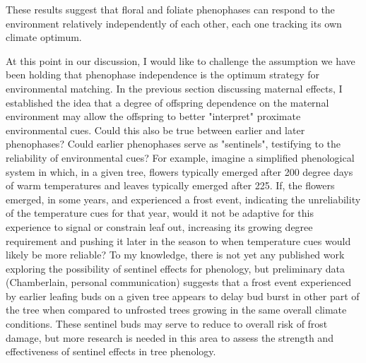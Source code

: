 \documentclass{article}\usepackage[]{graphicx}\usepackage[]{color}
\begin{document}
These results suggest that floral and foliate phenophases can respond to the environment relatively independently of each other, each one tracking its own climate optimum. 
\par At this point in our discussion, I would like to challenge the assumption we have been holding that phenophase independence is the optimum strategy for environmental matching. In the previous section discussing maternal effects, I established the idea that a degree of offspring dependence on the maternal environment may allow the offspring to better "interpret" proximate environmental cues. Could this also be true between earlier and later phenophases? Could earlier phenophases serve as "sentinels", testifying to the reliability of environmental cues? For example, imagine a simplified phenological system in which, in a given tree, flowers typically emerged after 200 degree days of warm temperatures and leaves typically emerged after 225. If, the flowers emerged, in some years, and experienced a frost event, indicating the unreliability of the temperature cues for that year,  would it not be adaptive for this experience to signal or constrain leaf out, increasing its growing degree requirement and pushing it later in the season to when temperature cues would likely be more reliable? To my knowledge, there is not yet any published work exploring the possibility of sentinel effects for phenology, but preliminary data (Chamberlain, personal communication) suggests that a frost event experienced by earlier leafing buds on a given tree appears to delay bud burst in other part of the tree when compared to unfrosted trees growing in the same overall climate conditions. These sentinel buds may serve to reduce to overall risk of frost damage, but more research is needed in this area to assess the strength and effectiveness of sentinel effects in tree phenology.
\end{document}
